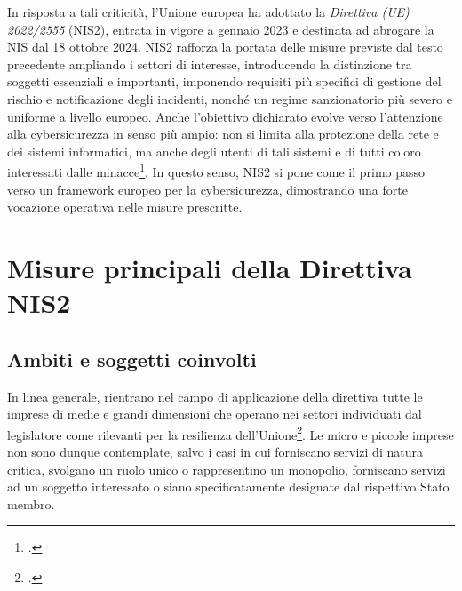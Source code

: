 In risposta a tali criticità, l’Unione europea ha adottato la \textit{Direttiva (UE) 2022/2555} 
(NIS2), entrata in vigore a gennaio 2023 e destinata ad abrogare la NIS dal 18 ottobre 
2024. NIS2 rafforza la portata delle misure previste dal testo precedente ampliando i settori di interesse,
introducendo la distinzione tra soggetti essenziali e importanti, imponendo requisiti più 
specifici di gestione del rischio e notificazione degli incidenti, nonché un regime sanzionatorio 
più severo e uniforme a livello europeo. Anche l'obiettivo dichiarato evolve verso l'attenzione alla cybersicurezza 
in senso più ampio: non si limita alla protezione della rete e dei sistemi informatici, ma anche degli utenti di
tali sistemi e di tutti coloro interessati dalle minacce\footcite[p. 5]{vandezande}. In questo
senso, NIS2 si pone come il primo passo verso un framework europeo per la cybersicurezza, 
dimostrando una forte vocazione operativa nelle misure prescritte.



\section{Misure principali della Direttiva NIS2}

\subsection{Ambiti e soggetti coinvolti}
In linea generale, rientrano nel campo di applicazione della direttiva tutte le imprese di 
medie e grandi dimensioni che operano nei settori individuati dal legislatore come rilevanti per la resilienza 
dell’Unione\footcite[art. 2]{nis2-directive}. Le micro e piccole imprese non sono dunque contemplate, salvo i casi in cui forniscano servizi di 
natura critica, svolgano un ruolo unico o rappresentino un monopolio, forniscano servizi ad un soggetto interessato
o siano specificatamente designate dal rispettivo Stato membro.

